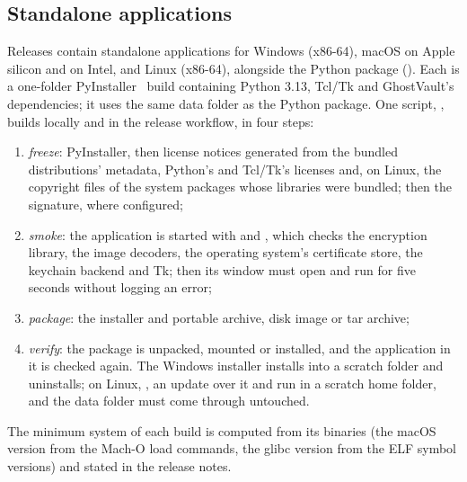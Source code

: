 \subsection{Standalone applications}\label{sec:builds}
Releases contain standalone applications for Windows (x86-64), macOS on Apple silicon and on
Intel, and Linux (x86-64), alongside the Python package (). Each is a one-folder
PyInstaller~\cite{pyinstaller} build containing Python 3.13, Tcl/Tk and GhostVault's dependencies;
it uses the same data folder as the Python package. One script, , builds
locally and in the release workflow, in four steps:
\begin{enumerate}
\item \emph{freeze}: PyInstaller, then license notices generated from the bundled distributions'
metadata, Python's and Tcl/Tk's licenses and, on Linux, the copyright files of the system packages
whose libraries were bundled; then the signature, where configured;
\item \emph{smoke}: the application is started with  and , which
checks the encryption library, the image decoders, the operating system's certificate store, the
keychain backend and Tk; then its window must open and run for five seconds without logging an
error;
\item \emph{package}: the installer and portable archive, disk image or tar archive;
\item \emph{verify}: the package is unpacked, mounted or installed, and the application in it is
checked again. The Windows installer installs into a scratch folder and uninstalls; on Linux,
, an update over it and  run in a scratch home folder, and the
data folder must come through untouched.
\end{enumerate}
The minimum system of each build is computed from its binaries (the macOS version from the Mach-O
load commands, the glibc version from the ELF symbol versions) and stated in the release notes.


